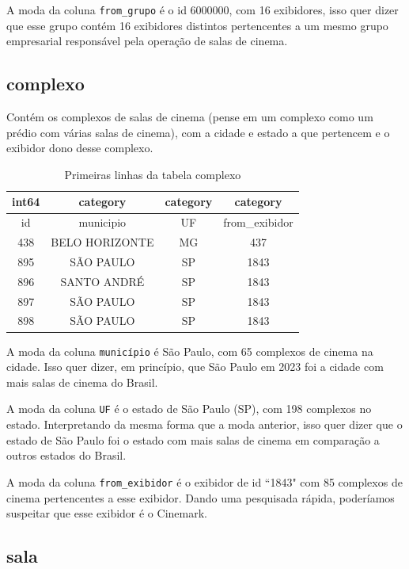 \documentclass[12pt, a4paper]{article}
\begin{document}
A moda da coluna \texttt{from\_grupo} é o id 6000000, com 16 exibidores, isso quer dizer que esse grupo contém 16 exibidores distintos pertencentes a um mesmo grupo empresarial responsável pela operação de salas de cinema.

\subsection{complexo}
Contém os complexos de salas de cinema (pense em um complexo como um prédio com várias salas de cinema), com a cidade e estado a que pertencem e o exibidor dono desse complexo.

\begin{table}[h]
    \centering
    \begin{tabular}{c|c|c|c}
    int64 & category & category & category\\
    \hline
         id&       municipio&  UF& from\_exibidor\\
         \hline
  438&  BELO HORIZONTE&  MG&           437\\
  895&       SÃO PAULO&  SP&          1843\\
  896&     SANTO ANDRÉ&  SP&          1843\\
  897&       SÃO PAULO&  SP&          1843\\
  898&       SÃO PAULO&  SP&          1843\\
    \end{tabular}
    \caption{Primeiras linhas da tabela complexo}
    \label{tab:complexo}
\end{table}

A moda da coluna \texttt{município} é São Paulo, com 65 complexos de cinema na cidade. Isso quer dizer, em princípio, que São Paulo em 2023 foi a cidade com mais salas de cinema do Brasil.

A moda da coluna \texttt{UF} é o estado de São Paulo (SP), com 198 complexos no estado. Interpretando da mesma forma que a moda anterior, isso quer dizer que o estado de São Paulo foi o estado com mais salas de cinema em comparação a outros estados do Brasil.

A moda da coluna \texttt{from\_exibidor} é o exibidor de id ``1843" com 85 complexos de cinema pertencentes a esse exibidor. Dando uma pesquisada rápida, poderíamos suspeitar que esse exibidor é o Cinemark.

\subsection{sala}
\end{document}

